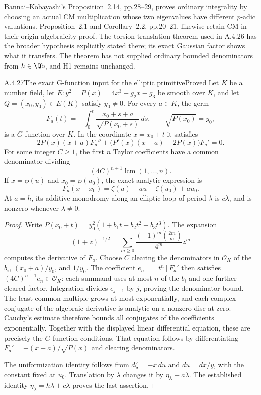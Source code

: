 Bannai--Kobayashi's Proposition~2.14, pp.28--29, proves ordinary integrality by choosing an actual CM multiplication whose two eigenvalues have different $p$-adic valuations. Proposition~2.1 and Corollary~2.2, pp.20--21, likewise retain CM in their origin-algebraicity proof. The torsion-translation theorem used in A.4.26 has the broader hypothesis explicitly stated there; its exact Gaussian factor shows what it transfers. The theorem has not supplied ordinary bounded denominators from $h\in\Qb$, and H1 remains unchanged.


\begin{result}{A.4.27}{The exact G-function input for the elliptic primitive}{Proved}
Let $K$ be a number field, let $E:y^2=P(x)=4x^3-g_2x-g_3$ be smooth over $K$, and let $Q=(x_0,y_0)\in E(K)$ satisfy $y_0\ne0$. For every $a\in K$, the germ
\[
 F_a(t)=-\int_0^t\frac{x_0+s+a}{\sqrt{P(x_0+s)}}\,ds,
 \qquad \sqrt{P(x_0)}=y_0,
\]
is a $G$-function over $K$. In the coordinate $x=x_0+t$ it satisfies
\[
 2P(x)(x+a)F_a''+
 \bigl(P'(x)(x+a)-2P(x)\bigr)F_a'=0.
\]
For some integer $C\ge1$, the first $n$ Taylor coefficients have a common denominator dividing
\[
 (4C)^{n+1}\operatorname{lcm}(1,\ldots,n).
\]
If $x=\wp(u)$ and $x_0=\wp(u_0)$, the exact analytic expression is
\[
 F_a(x-x_0)=\zeta(u)-au-\zeta(u_0)+au_0.
\]
At $a=h$, its additive monodromy along an elliptic loop of period $\lambda$ is $c\bar\lambda$, and is nonzero whenever $\lambda\ne0$.
\end{result}
\begin{proof}
Write $P(x_0+t)=y_0^2(1+b_1t+b_2t^2+b_3t^3)$. The expansion
\[
 (1+z)^{-1/2}=
 \sum_{m\ge0}\frac{(-1)^m\binom{2m}{m}}{4^m}z^m
\]
computes the derivative of $F_a$. Choose $C$ clearing the denominators in $\mathcal O_K$ of the $b_i$, $(x_0+a)/y_0$, and $1/y_0$. The coefficient $e_n=[t^n]F_a'$ then satisfies $(4C)^{n+1}e_n\in\mathcal O_K$: each summand uses at most $n$ of the $b_i$ and one further cleared factor. Integration divides $e_{j-1}$ by $j$, proving the denominator bound. The least common multiple grows at most exponentially, and each complex conjugate of the algebraic derivative is analytic on a nonzero disc at zero. Cauchy's estimate therefore bounds all conjugates of the coefficients exponentially. Together with the displayed linear differential equation, these are precisely the $G$-function conditions. That equation follows by differentiating $F_a'=-(x+a)/\sqrt{P(x)}$ and clearing denominators.

The uniformization identity follows from $d\zeta=-x\,du$ and $du=dx/y$, with the constant fixed at $u_0$. Translation by $\lambda$ changes it by $\eta_\lambda-a\lambda$. The established identity $\eta_\lambda=h\lambda+c\bar\lambda$ proves the last assertion.
\end{proof}

